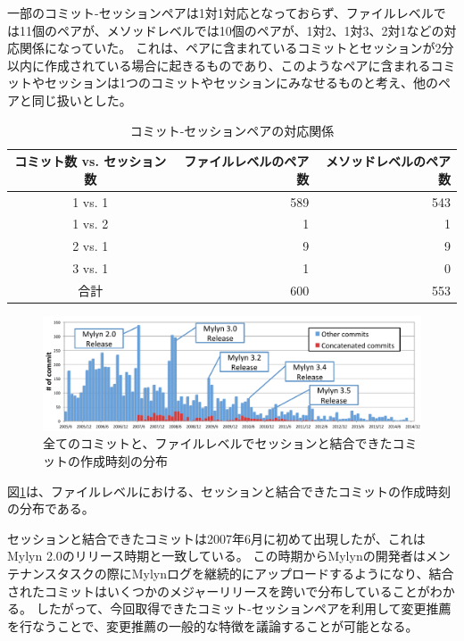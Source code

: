 \documentclass[a4paper]{jsbook}
\begin{document}
一部のコミット-セッションペアは1対1対応となっておらず、ファイルレベルでは11個のペアが、メソッドレベルでは10個のペアが、1対2、1対3、2対1などの対応関係になっていた。
これは、ペアに含まれているコミットとセッションが2分以内に作成されている場合に起きるものであり、このようなペアに含まれるコミットやセッションは1つのコミットやセッションにみなせるものと考え、他のペアと同じ扱いとした。
\begin{table}[tb]
  \begin{center}
    \caption{コミット-セッションペアの対応関係}
\label{squash}
\begin{tabular}{c|rr}
  \hline
  コミット数 vs. セッション数 & ファイルレベルのペア数& メソッドレベルのペア数\\
    \hline
  1 vs. 1 & 589 & 543\\
  1 vs. 2 & 1 & 1\\
  2 vs. 1 & 9 & 9\\
  3 vs. 1 & 1 & 0\\
\hline
  合計 & 600& 553\\
  \hline
\end{tabular}
  \end{center}
\end{table}

\begin{figure}[tb]
  \centering
  \includegraphics[width = 0.9\linewidth]{resource/commit_distribution.pdf}
  \caption{全てのコミットと、ファイルレベルでセッションと結合できたコミットの作成時刻の分布}
  \label{commit_distribution}
\end{figure}
図\ref{commit_distribution}は、ファイルレベルにおける、セッションと結合できたコミットの作成時刻の分布である。

セッションと結合できたコミットは2007年6月に初めて出現したが、これはMylyn 2.0のリリース時期と一致している。
この時期からMylynの開発者はメンテナンスタスクの際にMylynログを継続的にアップロードするようになり、結合されたコミットはいくつかのメジャーリリースを跨いで分布していることがわかる。
したがって、今回取得できたコミット-セッションペアを利用して変更推薦を行なうことで、変更推薦の一般的な特徴を議論することが可能となる。
\end{document}
